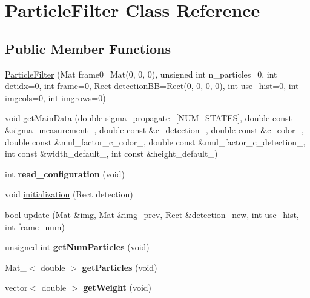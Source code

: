 \hypertarget{classParticleFilter}{\section{Particle\-Filter Class Reference}
\label{classParticleFilter}
}
\subsection*{Public Member Functions}
\begin{DoxyCompactItemize}
\item 
\hyperlink{classParticleFilter_a911e43a6edf42f84f8d0f2bf3fe9a81d}{Particle\-Filter} (Mat frame0=Mat(0, 0, 0), unsigned int n\-\_\-particles=0, int detidx=0, int frame=0, Rect detection\-B\-B=Rect(0, 0, 0, 0), int use\-\_\-hist=0, int imgcols=0, int imgrows=0)
\item 
void \hyperlink{classParticleFilter_a597529ba9f75bf4e56da5768cbc8b1a0}{get\-Main\-Data} (double sigma\-\_\-propagate\-\_\-\mbox{[}N\-U\-M\-\_\-\-S\-T\-A\-T\-E\-S\mbox{]}, double const \&sigma\-\_\-measurement\-\_\-, double const \&c\-\_\-detection\-\_\-, double const \&c\-\_\-color\-\_\-, double const \&mul\-\_\-factor\-\_\-c\-\_\-color\-\_\-, double const \&mul\-\_\-factor\-\_\-c\-\_\-detection\-\_\-, int const \&width\-\_\-default\-\_\-, int const \&height\-\_\-default\-\_\-)
\item 
\hypertarget{classParticleFilter_abcabd85de8860d10e5f21dc56291fdae}{int {\bfseries read\-\_\-configuration} (void)}\label{classParticleFilter_abcabd85de8860d10e5f21dc56291fdae}

\item 
void \hyperlink{classParticleFilter_a62028a3f90bd02f924fd2367451a5614}{initialization} (Rect detection)
\item 
bool \hyperlink{classParticleFilter_a3dd040ad3bc638548ba4582d44855fc5}{update} (Mat \&img, Mat \&img\-\_\-prev, Rect \&detection\-\_\-new, int use\-\_\-hist, int frame\-\_\-num)
\item 
\hypertarget{classParticleFilter_a7f99cd11047647020b6a4c90e2488c3d}{unsigned int {\bfseries get\-Num\-Particles} (void)}\label{classParticleFilter_a7f99cd11047647020b6a4c90e2488c3d}

\item 
\hypertarget{classParticleFilter_a04c223286cac007b5b06a927e3028639}{Mat\-\_\-$<$ double $>$ {\bfseries get\-Particles} (void)}\label{classParticleFilter_a04c223286cac007b5b06a927e3028639}

\item 
\hypertarget{classParticleFilter_a084bb2abe1da120fef6fc16116911957}{vector$<$ double $>$ {\bfseries get\-Weight} (void)}\label{classParticleFilter_a084bb2abe1da120fef6fc16116911957}


\end{DoxyCompactItemize}
